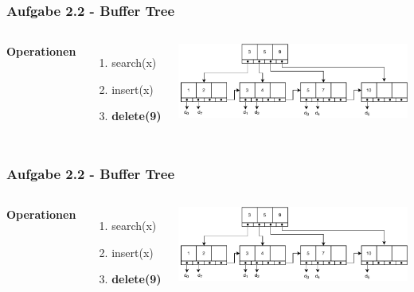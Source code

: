 \documentclass[aspectratio=169]{beamer}
\begin{document}
\begin{frame}
\frametitle{Aufgabe 2.2 - Buffer Tree}
\begin{columns}[c] %
	
	\textbf{Operationen}
	\begin{enumerate}
		\item search(x)
		\item insert(x)
		\item \textbf{delete(9)}
	\end{enumerate}
	
	\includegraphics[scale=.6]{bplus_delete_9.pdf}
	

	
\end{columns}
\end{frame}
	



\begin{frame}
\frametitle{Aufgabe 2.2 - Buffer Tree}
\begin{columns}[c] %
	
	\textbf{Operationen}
	\begin{enumerate}
		\item search(x)
		\item insert(x)
		\item \textbf{delete(9)}
	\end{enumerate}
	
	\includegraphics[scale=.6]{bplus_delete_9.pdf}
	

	
\end{columns}
\end{frame}
\end{document}
